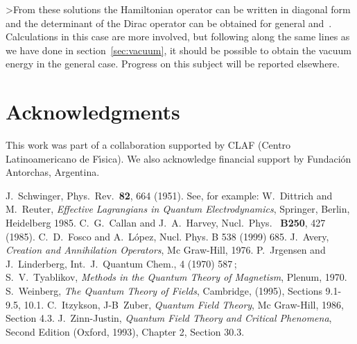 \documentclass[a4paper,12pt]{article}
\providecommand{\Fd}{\widetilde{F}}
\providecommand{\n}{\eta}
\begin{document}
>From these solutions the Hamiltonian operator can be written in
diagonal form and the determinant of the Dirac operator can be
obtained for general \myHighlight{$\Fd$}\coordHE{} and~\myHighlight{$\n$}\coordHE{}. Calculations in this case are
more involved, but following along the same lines as we have done in
section~\ref{sec:vacuum}, it should be possible to obtain the vacuum
energy in the general case. Progress on this subject will be reported
elsewhere.

\section*{Acknowledgments}
This work was part of a collaboration supported by CLAF (Centro
Latinoamericano de F{\'\i}sica). We also acknowledge financial support by
Fundaci{\'o}n Antorchas, Argentina.
\begin{thebibliography}{99}
J.~Schwinger, Phys.~Rev.~{\bf 82}, 664 (1951).
See, for example: W.~Dittrich and M.~Reuter,
{\em Effective Lagrangians in Quantum Electrodynamics}, Springer, Berlin,
Heidelberg 1985.
C.\ G.\ Callan and J.\ A.\ Harvey, Nucl.\ Phys.\ {\bf
    B250}, 427 (1985).
C.~D.~Fosco and A.~L{\'o}pez, Nucl. Phys. B 538 (1999)
  685.
J.~Avery, {\em Creation and Annihilation Operators}, 
Mc Graw-Hill, 1976.
P.~J\coordHE{}rgensen and J.~Linderberg,
  Int.~J.~Quantum Chem., 4 (1970) 587\,;\\
  S.~V.~Tyablikov, {\em Methods in the Quantum Theory of Magnetism}, Plenum, 1970.  
S.~Weinberg, {\em The Quantum
    Theory of Fields}, Cambridge, (1995), Sections 9.1-9.5, 10.1.
C.~Itzykson, J-B~Zuber, {\em Quantum Field Theory},
  Mc Graw-Hill, 1986, Section 4.3.
J.~Zinn-Justin, {\em Quantum Field Theory and
    Critical Phenomena}, Second Edition (Oxford, 1993), Chapter 2,
  Section 30.3.
\end{thebibliography}
\end{document}
